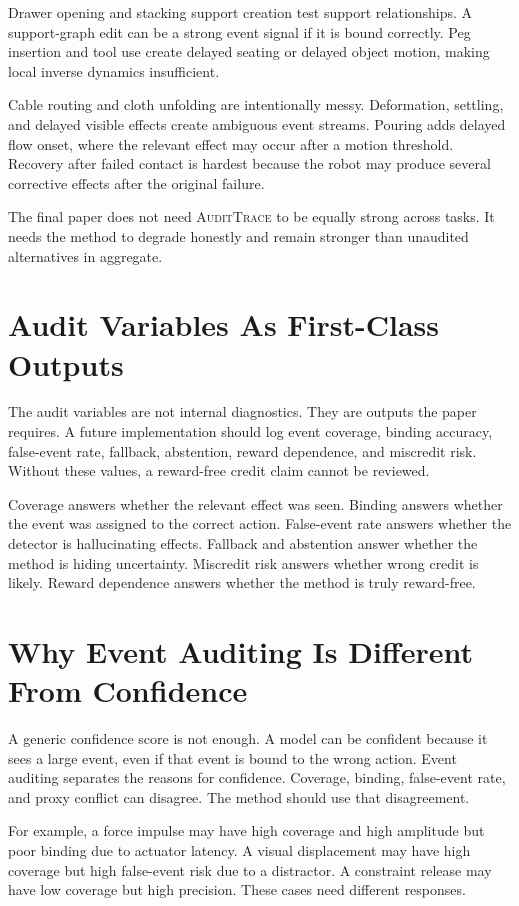 \documentclass{article}
\newcommand{\method}{\textsc{AuditTrace}\xspace}
\begin{document}
Drawer opening and stacking support creation test support relationships. A support-graph edit can be a strong event signal if it is bound correctly. Peg insertion and tool use create delayed seating or delayed object motion, making local inverse dynamics insufficient.

Cable routing and cloth unfolding are intentionally messy. Deformation, settling, and delayed visible effects create ambiguous event streams. Pouring adds delayed flow onset, where the relevant effect may occur after a motion threshold. Recovery after failed contact is hardest because the robot may produce several corrective effects after the original failure.

The final paper does not need \method to be equally strong across tasks. It needs the method to degrade honestly and remain stronger than unaudited alternatives in aggregate.

\section{Audit Variables As First-Class Outputs}

The audit variables are not internal diagnostics. They are outputs the paper requires. A future implementation should log event coverage, binding accuracy, false-event rate, fallback, abstention, reward dependence, and miscredit risk. Without these values, a reward-free credit claim cannot be reviewed.

Coverage answers whether the relevant effect was seen. Binding answers whether the event was assigned to the correct action. False-event rate answers whether the detector is hallucinating effects. Fallback and abstention answer whether the method is hiding uncertainty. Miscredit risk answers whether wrong credit is likely. Reward dependence answers whether the method is truly reward-free.

\section{Why Event Auditing Is Different From Confidence}

A generic confidence score is not enough. A model can be confident because it sees a large event, even if that event is bound to the wrong action. Event auditing separates the reasons for confidence. Coverage, binding, false-event rate, and proxy conflict can disagree. The method should use that disagreement.

For example, a force impulse may have high coverage and high amplitude but poor binding due to actuator latency. A visual displacement may have high coverage but high false-event risk due to a distractor. A constraint release may have low coverage but high precision. These cases need different responses.
\end{document}
